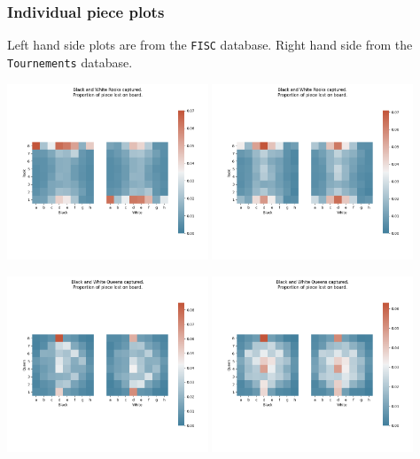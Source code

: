 \documentclass[11pt]{article}
\begin{document}
\subsubsection{Individual piece plots}
\label{sec:org49d5bca}
Left hand side plots are from the \texttt{FISC} database. Right hand side from the \texttt{Tournements} database.
\begin{center}
\includegraphics[width=0.45\textwidth]{Images/_HEATMAP_Rook_FISC.png}
\includegraphics[width=0.45\textwidth]{Images/_HEATMAP_Rook_TOURNEMENTS.png}
\end{center}

\begin{center}
\includegraphics[width=0.45\textwidth]{Images/_HEATMAP_Queen_FISC.png}
\includegraphics[width=0.45\textwidth]{Images/_HEATMAP_Queen_TOURNEMENTS.png}
\end{center}
\end{document}

